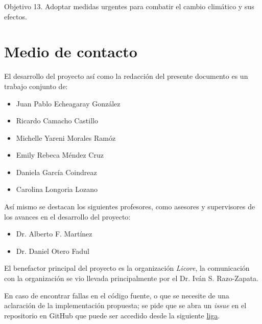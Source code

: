 \documentclass{article}
\begin{document}
        Objetivo 13. Adoptar medidas urgentes para combatir el cambio climático y sus efectos.

    \section{Medio de contacto}\label{sec:contact}

        El desarrollo del proyecto así como la redacción del presente documento es un trabajo conjunto de:
        \begin{itemize}
            \item Juan Pablo Echeagaray González
            \item Ricardo Camacho Castillo
            \item Michelle Yareni Morales Ramóz
            \item Emily Rebeca Méndez Cruz
            \item Daniela García Coindreaz
            \item Carolina Longoria Lozano
        \end{itemize}

        Así mismo se destacan los siguientes profesores, como asesores y supervisores de los avances en el desarrollo del proyecto:
        \begin{itemize}
            \item Dr. Alberto F. Martínez
            \item Dr. Daniel Otero Fadul
        \end{itemize}

        El benefactor principal del proyecto es la organización \textit{Licore}, la comunicación con la organización se vio llevada principalmente por el Dr. Iván S. Razo-Zapata.

        En caso de encontrar fallas en el código fuente, o que se necesite de una aclaración de la implementación propuesta; se pide que se abra un \textit{issue} en el repositorio en GitHub que puede ser accedido desde la siguiente \href{https://github.com/JuanEcheagaray75/licore-pki}{liga}.

    \clearpage
    
    
\end{document}
